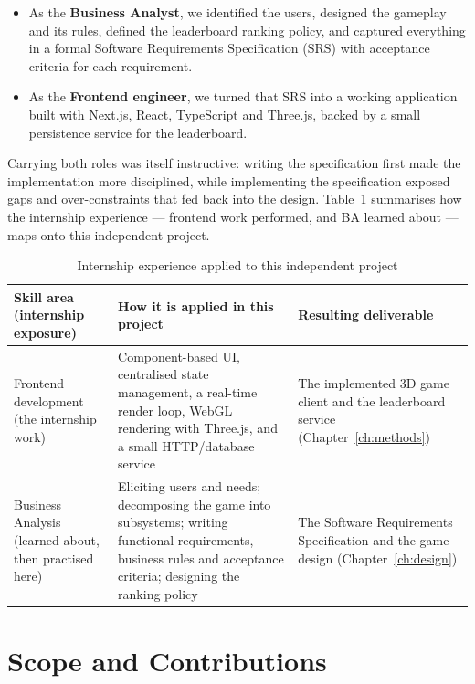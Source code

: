 \documentclass[12pt,a4paper]{report}
\begin{document}
\begin{itemize}
  \item As the \textbf{Business Analyst}, we identified the users, designed the
        gameplay and its rules, defined the leaderboard ranking policy, and
        captured everything in a formal Software Requirements Specification
        (SRS) with acceptance criteria for each requirement.
  \item As the \textbf{Frontend engineer}, we turned that SRS into a working
        application built with Next.js, React, TypeScript and Three.js, backed
        by a small persistence service for the leaderboard.
\end{itemize}

Carrying both roles was itself instructive: writing the specification first
made the implementation more disciplined, while implementing the specification
exposed gaps and over-constraints that fed back into the design. Table~\ref{tab:internship-skills}
summarises how the internship experience --- frontend work performed, and BA
learned about --- maps onto this independent project.

\begin{table}[htbp]
\centering
\caption{Internship experience applied to this independent project}
\label{tab:internship-skills}
\begin{tabular}{|p{3.6cm}|p{5.0cm}|p{4.0cm}|}
\hline
\textbf{Skill area (internship exposure)} &
\textbf{How it is applied in this project} &
\textbf{Resulting deliverable} \\
\hline
Frontend development \newline (the internship work) &
Component-based UI, centralised state management, a real-time render loop, WebGL
rendering with Three.js, and a small HTTP/database service &
The implemented 3D game client and the leaderboard service (Chapter~\ref{ch:methods}) \\
\hline
Business Analysis \newline (learned about, then practised here) &
Eliciting users and needs; decomposing the game into subsystems; writing
functional requirements, business rules and acceptance criteria; designing the
ranking policy &
The Software Requirements Specification and the game design
(Chapter~\ref{ch:design}) \\
\hline
\end{tabular}
\end{table}

\section{Scope and Contributions}
\end{document}
